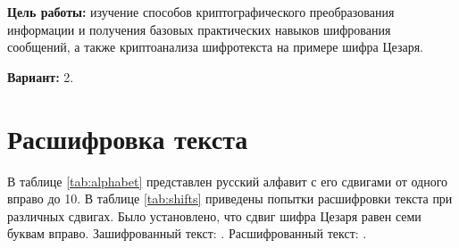 \documentclass{bsuir}
\begin{document}
\maketitle
\mainmatter

\textbf{Цель работы:} изучение способов криптографического преобразования информации и получения
базовых практических навыков шифрования сообщений, а также криптоанализа шифротекста на примере
шифра Цезаря.

\textbf{Вариант:} 2.

\section{Расшифровка текста}

В таблице \ref{tab:alphabet} представлен русский алфавит с его сдвигами от одного вправо до 10. В
таблице \ref{tab:shifts} приведены попытки расшифровки текста при различных сдвигах. Было
установлено, что сдвиг шифра Цезаря равен семи буквам вправо. Зашифрованный текст: . Расшифрованный текст:
.
\end{document}
